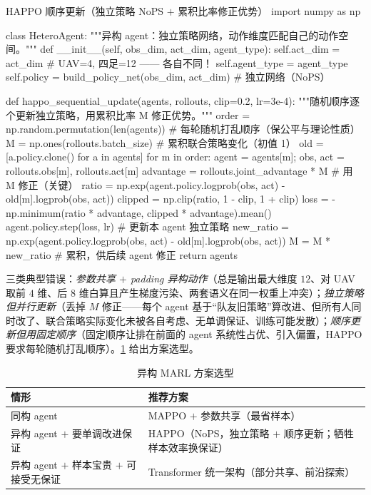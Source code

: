 \begin{codebox}[Python]{HAPPO 顺序更新（独立策略 NoPS $+$ 累积比率修正优势）}
import numpy as np

class HeteroAgent:
    """异构 agent：独立策略网络，动作维度匹配自己的动作空间。"""
    def __init__(self, obs_dim, act_dim, agent_type):
        self.act_dim = act_dim                  # UAV=4, 四足=12 —— 各自不同！
        self.agent_type = agent_type
        self.policy = build_policy_net(obs_dim, act_dim)   # 独立网络（NoPS）

def happo_sequential_update(agents, rollouts, clip=0.2, lr=3e-4):
    """随机顺序逐个更新独立策略，用累积比率 M 修正优势。"""
    order = np.random.permutation(len(agents))  # 每轮随机打乱顺序（保公平与理论性质）
    M = np.ones(rollouts.batch_size)            # 累积联合策略变化（初值 1）
    old = [a.policy.clone() for a in agents]
    for m in order:
        agent = agents[m]; obs, act = rollouts.obs[m], rollouts.act[m]
        advantage = rollouts.joint_advantage * M               # 用 M 修正（关键）
        ratio = np.exp(agent.policy.logprob(obs, act) - old[m].logprob(obs, act))
        clipped = np.clip(ratio, 1 - clip, 1 + clip)
        loss = -np.minimum(ratio * advantage, clipped * advantage).mean()
        agent.policy.step(loss, lr)                            # 更新本 agent 独立策略
        new_ratio = np.exp(agent.policy.logprob(obs, act) - old[m].logprob(obs, act))
        M = M * new_ratio                                      # 累积，供后续 agent 修正
    return agents
\end{codebox}

\noindent 三类典型错误：\emph{参数共享 $+$ padding 异构动作}（总是输出最大维度 $12$、对 UAV 取前 $4$ 维、后 $8$ 维白算且产生梯度污染、两套语义在同一权重上冲突）；\emph{独立策略但并行更新}（丢掉 $M$ 修正——每个 agent 基于“队友旧策略”算改进、但所有人同时改了、联合策略实际变化未被各自考虑、无单调保证、训练可能发散）；\emph{顺序更新但用固定顺序}（固定顺序让排在前面的 agent 系统性占优、引入偏置，HAPPO 要求每轮随机打乱顺序）。\cref{tab:hmr-marl-choose} 给出方案选型。

\begin{table}[H]\centering\small
\caption{异构 MARL 方案选型}
\label{tab:hmr-marl-choose}
\begin{tabular}{ll}
\toprule
情形 & 推荐方案 \\
\midrule
同构 agent & MAPPO $+$ 参数共享（最省样本） \\
异构 agent $+$ 要单调改进保证 & HAPPO（NoPS，独立策略 $+$ 顺序更新；牺牲样本效率换保证） \\
异构 agent $+$ 样本宝贵 $+$ 可接受无保证 & Transformer 统一架构（部分共享、前沿探索） \\
\bottomrule
\end{tabular}
\end{table}

